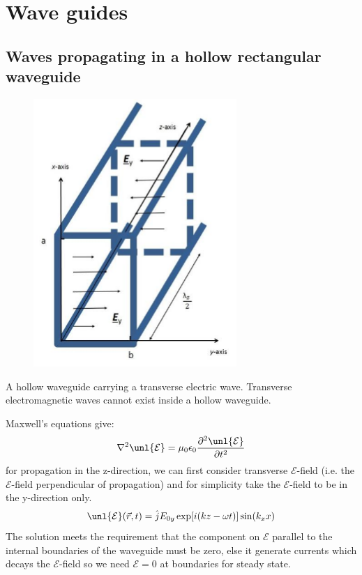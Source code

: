 \documentclass[a4paper, 11pt, normalem]{report}
\newcommand\p{\partial}
\newcommand\E{\mathcal{E}}
\newcommand\uE{\unl{\E}}
\newcommand\eno{\epsilon_0}
\newcommand\vr{\vec{r}}
\newcommand\om{\omega}
\begin{document}
\section{Wave guides}
\subsection{Waves propagating in a hollow rectangular waveguide}

\begin{figure}[H]
	\centering
	\includegraphics[scale=0.4]{box.png}
\end{figure}

A hollow waveguide carrying a transverse electric wave.
Transverse electromagnetic waves cannot exist inside a hollow waveguide.

Maxwell's equations give:
\begin{equation}
	\nabla^2\uE = \mu_0\eno\frac{\p^2\uE}{\p t^2}
\end{equation}
for propagation in the z-direction, we can first consider transverse $\E$-field (i.e. the $\E$-field perpendicular of propagation) and for simplicity take the $\E$-field to be in the y-direction only.
\begin{equation}
	\uE(\vr,t) = \hat{j}E_{0y}\exp[i(kz - \om t)]\sin(k_xx)
\end{equation}
The solution meets the requirement that the component on $\E$ parallel to the internal boundaries of the waveguide must be zero, else it generate currents which decays the $\E$-field so we need $\E = 0$ at boundaries for steady state.
\end{document}
